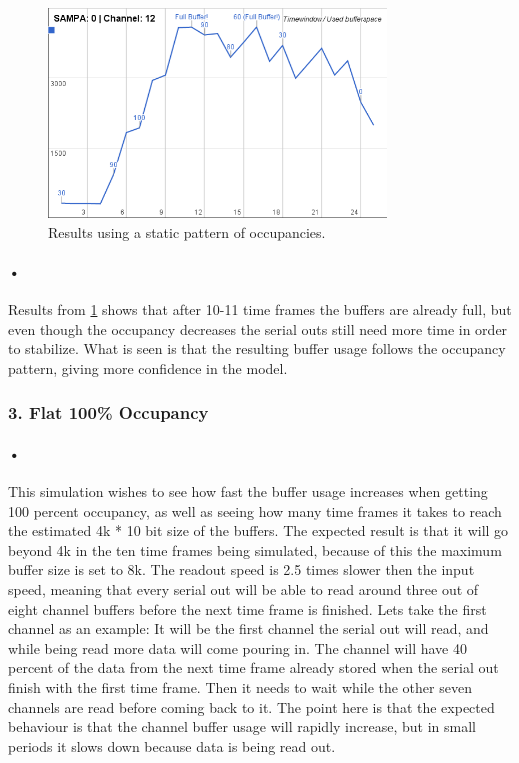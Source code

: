 \documentclass[a4paper, 12pt]{report}
\begin{document}
\begin{figure}[h!]
	\centering
		\includegraphics[width=0.8\textwidth]{images/results-alternating.png}
		\caption{Results using a static pattern of occupancies.}
		\label{fig:results-alternating}
\end{figure}

\paragraph{•} %
Results from \ref{fig:results-alternating} shows that after 10-11 time frames the buffers are already full, but even though the occupancy decreases the serial outs still need more time in order to stabilize.
What is seen is that the resulting buffer usage follows the occupancy pattern, giving more confidence in the model.

\subsubsection{3. Flat 100\% Occupancy}

\paragraph{•} %
This simulation wishes to see how fast the buffer usage increases when getting 100 percent occupancy, as well as seeing how many time frames it takes to reach the estimated 4k * 10 bit size of the buffers.
The expected result is that it will go beyond 4k in the ten time frames being simulated, because of this the maximum buffer size is set to 8k.
The readout speed is 2.5 times slower then the input speed, meaning that every serial out will be able to read around three out of eight channel buffers before the next time frame is finished.
Lets take the first channel as an example: It will be the first channel the serial out will read, and while being read more data will come pouring in.
The channel will have 40 percent of the data from the next time frame already stored when the serial out finish with the first time frame.
Then it needs to wait while the other seven channels are read before coming back to it.
The point here is that the expected behaviour is that the channel buffer usage will rapidly increase, but in small periods it slows down because data is being read out.
\end{document}
